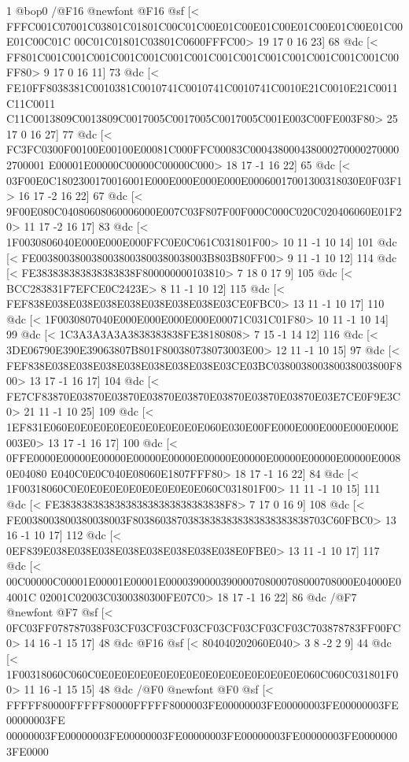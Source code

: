 1 @bop0
/@F16 @newfont
@F16 @sf
[<
FFFC001C07001C03801C01801C00C01C00E01C00E01C00E01C00E01C00E01C00E01C00C01C
00C01C01801C03801C0600FFFC00>
	 19 17 0 16 23] 68 @dc
[<
FF801C001C001C001C001C001C001C001C001C001C001C001C001C001C001C00FF80>
	 9 17 0 16 11] 73 @dc
[<
FE10FF8038381C0010381C0010741C0010741C0010741C0010E21C0010E21C0011C11C0011
C11C0013809C0013809C0017005C0017005C0017005C001E003C00FE003F80>
	 25 17 0 16 27] 77 @dc
[<
FC3FC0300F00100E00100E00081C000FFC00083C0004380004380002700002700002700001
E00001E00000C00000C00000C000>
	 18 17 -1 16 22] 65 @dc
[<
03F00E0C1802300170016001E000E000E000E000E00060017001300318030E0F03F1>
	 16 17 -2 16 22] 67 @dc
[<
9F00E080C04080608060006000E007C03F807F00F000C000C020C020406060E01F20>
	 11 17 -2 16 17] 83 @dc
[<
1F0030806040E000E000E000FFC0E0C061C031801F00>
	 10 11 -1 10 14] 101 @dc
[<
FE0038003800380038003800380038003B803B80FF00>
	 9 11 -1 10 12] 114 @dc
[<
FE383838383838383838F800000000103810>
	 7 18 0 17 9] 105 @dc
[<
BCC283831F7EFCE0C2423E>
	 8 11 -1 10 12] 115 @dc
[<
FEF838E038E038E038E038E038E038E038E03CE0FBC0>
	 13 11 -1 10 17] 110 @dc
[<
1F0030807040E000E000E000E000E00071C031C01F80>
	 10 11 -1 10 14] 99 @dc
[<
1C3A3A3A3A3838383838FE38180808>
	 7 15 -1 14 12] 116 @dc
[<
3DE06790E390E39063807B801F800380738073003E00>
	 12 11 -1 10 15] 97 @dc
[<
FEF838E038E038E038E038E038E038E038E03CE03BC038003800380038003800F800>
	 13 17 -1 16 17] 104 @dc
[<
FE7CF83870E03870E03870E03870E03870E03870E03870E03870E03E7CE0F9E3C0>
	 21 11 -1 10 25] 109 @dc
[<
1EF831E060E0E0E0E0E0E0E0E0E0E0E060E030E00FE000E000E000E000E000E003E0>
	 13 17 -1 16 17] 100 @dc
[<
0FFE0000E00000E00000E00000E00000E00000E00000E00000E00000E00000E00080E04080
E040C0E0C040E08060E1807FFF80>
	 18 17 -1 16 22] 84 @dc
[<
1F00318060C0E0E0E0E0E0E0E0E0E0E060C031801F00>
	 11 11 -1 10 15] 111 @dc
[<
FE383838383838383838383838383838F8>
	 7 17 0 16 9] 108 @dc
[<
FE0038003800380038003F80386038703838383838383838383838703C60FBC0>
	 13 16 -1 10 17] 112 @dc
[<
0EF839E038E038E038E038E038E038E038E038E0FBE0>
	 13 11 -1 10 17] 117 @dc
[<
00C00000C00001E00001E00001E0000390000390000708000708000708000E04000E04001C
02001C02003C0300380300FE07C0>
	 18 17 -1 16 22] 86 @dc
/@F7 @newfont
@F7 @sf
[<
0FC03FF078787038F03CF03CF03CF03CF03CF03CF03CF03C703878783FF00FC0>
	 14 16 -1 15 17] 48 @dc
@F16 @sf
[<
804040202060E040>
	 3 8 -2 2 9] 44 @dc
[<
1F00318060C060C0E0E0E0E0E0E0E0E0E0E0E0E0E0E0E0E060C060C031801F00>
	 11 16 -1 15 15] 48 @dc
/@F0 @newfont
@F0 @sf
[<
FFFFF80000FFFFF80000FFFFF8000003FE00000003FE00000003FE00000003FE00000003FE
00000003FE00000003FE00000003FE00000003FE00000003FE00000003FE00000003FE0000
